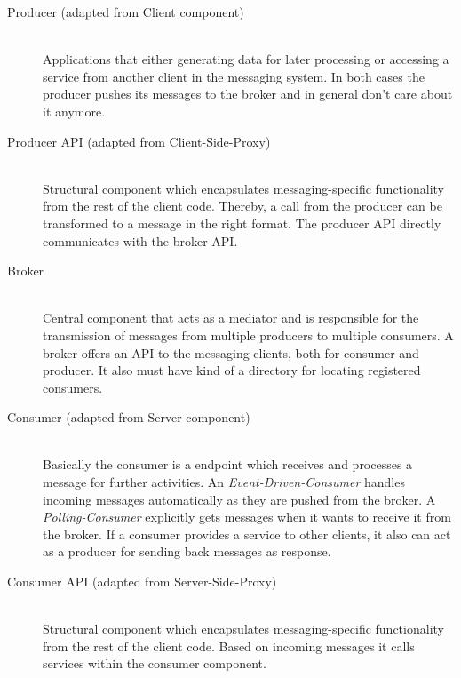 \begin{description}
    \item[Producer (adapted from Client component)] \hfill \\
        {Applications that either generating data for later processing or
        accessing a service from another client in the messaging system. In both
        cases the producer pushes its messages to the broker and in general don't care 
        about it anymore.}
    \item[Producer API (adapted from Client-Side-Proxy)] \hfill \\
        {Structural component which encapsulates messaging-specific
        functionality from the rest of the client code. Thereby, a call from the producer
        can be transformed to a message in the right format. The producer API
        directly communicates with the broker API.}
    \item[Broker] \hfill \\
        {Central component that acts as a mediator and is responsible for the
        transmission of messages from multiple producers to multiple consumers.
        A broker offers an API to the messaging clients, both for consumer and
        producer. It also must have kind of a directory for locating registered
        consumers.} 
    \item[Consumer (adapted from Server component)] \hfill \\
        {Basically the consumer is a endpoint which receives and processes a
            message for further activities. An \textit{Event-Driven-Consumer}
            handles incoming messages automatically as they are pushed from the
            broker. A \textit{Polling-Consumer} explicitly gets messages when it
            wants to receive it from the broker. If a consumer provides a
            service to other clients, it also can act as a producer for sending
            back messages as response.}
\item[Consumer API (adapted from Server-Side-Proxy)] \hfill \\
        {Structural component which encapsulates messaging-specific
        functionality from the rest of the client code. Based on incoming
        messages it calls services within the consumer component. }
\end{description}

